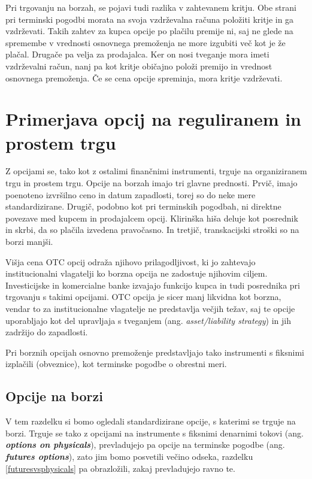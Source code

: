 \documentclass[a4paper]{article}
\begin{document}
Pri trgovanju na borzah, se pojavi tudi razlika v zahtevanem kritju.
Obe strani pri terminski pogodbi morata na svoja vzdrževalna računa položiti kritje in ga vzdrževati. Takih zahtev za kupca opcije
po plačilu premije ni, saj ne glede na spremembe v vrednosti osnovnega premoženja ne more izgubiti več kot je že plačal.
Drugače pa velja za prodajalca. Ker on nosi tveganje mora imeti vzdrževalni račun, nanj pa kot kritje običajno položi premijo in vrednost osnovnega premoženja. Če se cena 
opcije spreminja, mora kritje vzdrževati.

\section{Primerjava opcij na reguliranem in prostem trgu}
Z opcijami se, tako kot z ostalimi finančnimi instrumenti, trguje na organiziranem trgu in prostem trgu. Opcije na borzah imajo tri glavne prednosti. 
Prvič, imajo poenoteno izvršilno ceno in datum zapadlosti, torej so do neke mere standardizirane. Drugič, podobno kot pri terminskih pogodbah, ni direktne povezave
med kupcem in prodajalcem opcij. Klirinška hiša deluje kot posrednik in skrbi, da so plačila izvedena pravočasno. In tretjič, transkacijski
stroški so na borzi manjši. 

Višja cena OTC opcij odraža njihovo prilagodljivost, ki jo zahtevajo institucionalni vlagatelji ko borzna opcija ne zadostuje
njihovim ciljem. Investicijske in komercialne banke izvajajo funkcijo kupca in tudi posrednika pri trgovanju s takimi
opcijami. OTC opcija je sicer manj likvidna kot borzna, vendar to za institucionalne vlagatelje ne predstavlja večjih težav, 
saj te opcije uporabljajo kot del upravljaja s tveganjem (ang. \textit{asset/liability strategy}) in jih zadržijo do zapadlosti.

Pri borznih opcijah osnovno premoženje predstavljajo tako instrumenti s fiksnimi izplačili (obveznice),
kot terminske pogodbe o obrestni meri.

\subsection{Opcije na borzi}
V tem razdelku si bomo ogledali standardizirane opcije, s katerimi se trguje na borzi. Trguje se 
tako z opcijami na instrumente s fiksnimi denarnimi tokovi  (ang. \textit{\textbf{options on physicals}}), 
prevladujejo pa opcije na terminske pogodbe (ang. \textit{\textbf{futures options}}),
zato jim bomo posvetili večino odseka, razdelku \ref{futuresvsphysicals} pa obrazložili, zakaj prevladujejo ravno te.
\end{document}
